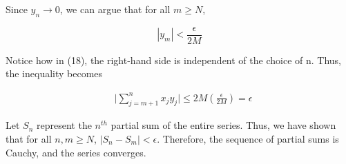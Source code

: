 \documentclass{article}
\begin{document}
Since $y_n \rightarrow 0$, we can argue that for all $m \geq N$, 

\begin{equation}
    | y_m | < \frac{\epsilon}{2M}
\end{equation}

Notice how in (18), the right-hand side is independent of the choice of n. Thus, the inequality becomes

\begin{equation}
\begin{split}
    &\Bigg|\sum_{j=m+1}^{n} x_j y_j \Bigg| \leq 2M(\frac{\epsilon}{2M}) = \epsilon
\end{split}
\end{equation}

Let $S_n$ represent the $n^{th}$ partial sum of the entire series. Thus, we have shown that for all $n, m \geq N$, $|S_n - S_m| < \epsilon$. Therefore, the sequence of partial sums is Cauchy, and the series converges.  
\end{document}
